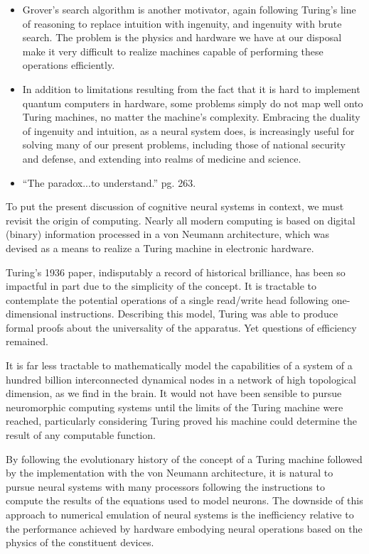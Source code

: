 \begin{itemize}
\item Grover's search algorithm is another motivator, again following Turing's line of reasoning to replace intuition with ingenuity, and ingenuity with brute search. The problem is the physics and hardware we have at our disposal make it very difficult to realize machines capable of performing these operations efficiently. 
\item In addition to limitations resulting from the fact that it is hard to implement quantum computers in hardware, some problems simply do not map well onto Turing machines, no matter the machine's complexity. Embracing the duality of ingenuity and intuition, as a neural system does, is increasingly useful for solving many of our present problems, including those of national security and defense, and extending into realms of medicine and science.
\item ``The paradox...to understand.'' \cite{dy2012} pg. 263.
\end{itemize}

\vspace{3em}
To put the present discussion of cognitive neural systems in context, we must revisit the origin of computing. Nearly all modern computing is based on digital (binary) information processed in a von Neumann architecture, which was devised as a means to realize a Turing machine in electronic hardware.

\vspace{3em}
Turing's 1936 paper, indisputably a record of historical brilliance, has been so impactful in part due to the simplicity of the concept. It is tractable to contemplate the potential operations of a single read/write head following one-dimensional instructions. Describing this model, Turing was able to produce formal proofs about the universality of the apparatus. Yet questions of efficiency remained. 

It is far less tractable to mathematically model the capabilities of a system of a hundred billion interconnected dynamical nodes in a network of high topological dimension, as we find in the brain. It would not have been sensible to pursue neuromorphic computing systems until the limits of the Turing machine were reached, particularly considering Turing proved his machine could determine the result of any computable function.

By following the evolutionary history of the concept of a Turing machine followed by the implementation with the von Neumann architecture, it is natural to pursue neural systems with many processors following the instructions to compute the results of the equations used to model neurons. The downside of this approach to numerical emulation of neural systems is the inefficiency relative to the performance achieved by hardware embodying neural operations based on the physics of the constituent devices.

